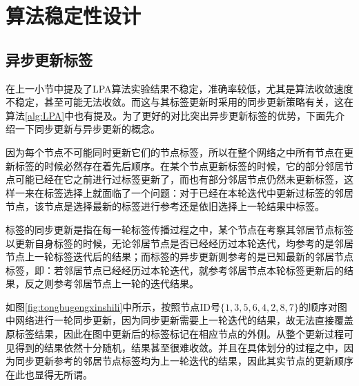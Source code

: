 \section{算法稳定性设计}

\subsection{异步更新标签}

在上一小节中提及了LPA算法实验结果不稳定，准确率较低，尤其是算法收敛速度不稳定，甚至可能无法收敛。而这与其标签更新时采用的同步更新策略有关，这在算法\ref{alg:LPA}中也有提及。为了更好的对比突出异步更新标签的优势，下面先介绍一下同步更新与异步更新的概念。

因为每个节点不可能同时更新它们的节点标签，所以在整个网络之中所有节点在更新标签的时候必然存在着先后顺序。在某个节点更新标签的时候，它的部分邻居节点可能已经在它之前进行过标签更新了，而也有部分邻居节点仍然未更新标签，这样一来在标签选择上就面临了一个问题：对于已经在本轮迭代中更新过标签的邻居节点，该节点是选择最新的标签进行参考还是依旧选择上一轮结果中标签。

标签的同步更新是指在每一轮标签传播过程之中，某个节点在考察其邻居节点标签以更新自身标签的时候，无论邻居节点是否已经经历过本轮迭代，均参考的是邻居节点上一轮标签迭代后的结果；而标签的异步更新则参考的是已知最新的邻居节点标签，即：若邻居节点已经经历过本轮迭代，就参考邻居节点本轮标签更新后的结果，反之则参考邻居节点上一轮的迭代结果。

如图\ref{fig:tongbugengxinshili}中所示，按照节点ID号$\{1,3,5,6,4,2,8,7 \} $的顺序对图中网络进行一轮同步更新，因为同步更新需要上一轮迭代的结果，故无法直接覆盖原标签结果，因此在图中更新后的标签标记在相应节点的外侧。从整个更新过程可见得到的结果依然十分随机，结果甚至很难收敛。并且在具体划分的过程之中，因为同步更新参考的邻居节点标签均为上一轮迭代的结果，因此其实节点的更新顺序在此也显得无所谓。

